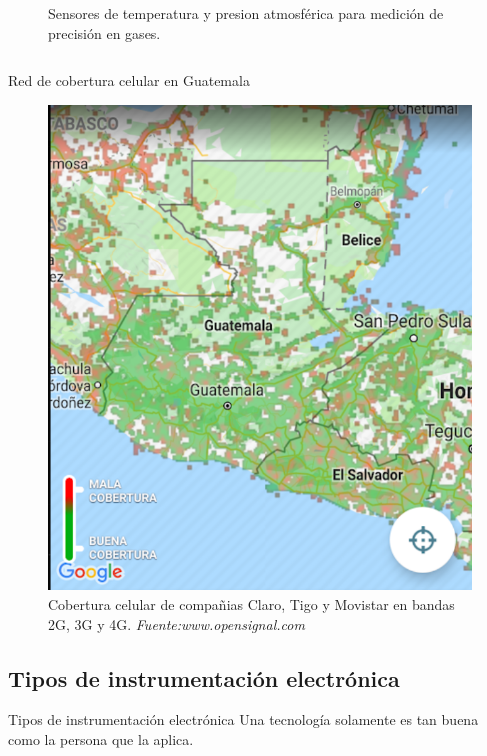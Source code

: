 \documentclass[]{beamer}
\begin{document}
\begin{frame}{}
\begin{columns}
\begin{column}{0.3\textwidth}
\begin{figure}
        \caption{Sensores de temperatura y presion atmosférica para medición de precisión en gases.}
        \label{}
      \end{figure}
    \end{column}
  \end{columns}
\end{frame}

\begin{frame}{Red de cobertura celular en Guatemala}
  \begin{figure}
    \includegraphics[height=0.75\textheight]{Docs/opensky}
    \caption{Cobertura celular de compañias Claro, Tigo y Movistar en bandas 2G, 3G y 4G.
    \emph{Fuente:www.opensignal.com}}
    \label{}
  \end{figure}
\end{frame}

\subsection{Tipos de instrumentación electrónica}
\begin{frame}{Tipos de instrumentación electrónica}
  \center
  Una tecnología solamente es tan buena como la persona que la aplica.
\end{frame}
\end{document}
